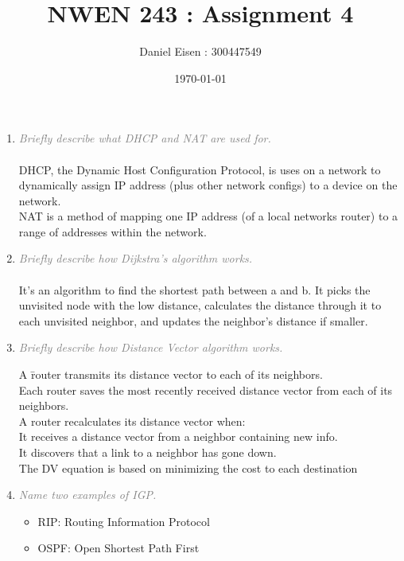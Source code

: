 \documentclass[a4paper,11pt]{article}
\title{NWEN 243 : Assignment 4}
\author{Daniel Eisen : 300447549}
\date{\today}
\begin{document}
\maketitle

\begin{enumerate}
\item
\textcolor{gray}{\textit{Briefly describe what DHCP and NAT are used for.}}\\ \\
DHCP, the Dynamic Host Configuration Protocol, is uses on a network to dynamically assign IP address (plus other network configs) to a device on the network.
\\
NAT is a method of mapping one IP address (of a local networks router) to a range of addresses within the network.
\item
\textcolor{gray}{\textit{Briefly describe how Dijkstra’s algorithm works.}}\\ \\
It's an algorithm to find the shortest path between a and b. It picks the unvisited node with the low distance, calculates the distance through it to each unvisited neighbor, and updates the neighbor's distance if smaller.
\item
\textcolor{gray}{\textit{Briefly describe how Distance Vector algorithm works.}}
\begin{tabbing}
A \= router transmits its distance vector to each of its neighbors.\\
Each router saves the most recently received distance vector from each of its neighbors.\\
A router recalculates its distance vector when:\\
\> It receives a distance vector from a neighbor containing new info.\\
\> It discovers that a link to a neighbor has gone down.\\
The DV equation is based on minimizing the cost to each destination
\end{tabbing}
\item
\textcolor{gray}{\textit{Name two examples of IGP.}}
\begin{itemize}
	\item RIP: Routing Information Protocol
	\item OSPF: Open Shortest Path First
\end{itemize}

\end{enumerate}
\end{document}
